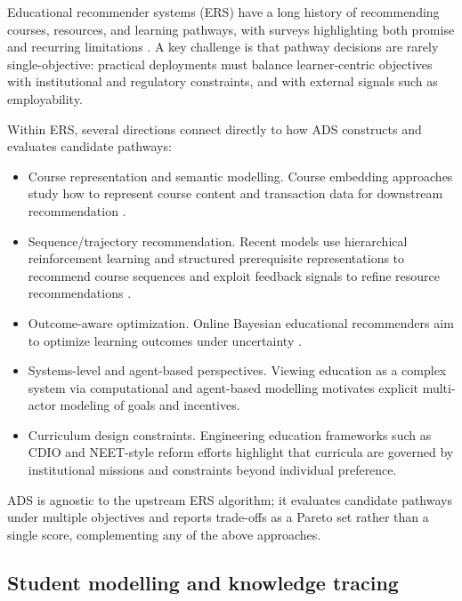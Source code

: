 \documentclass[sigconf,review]{acmart}
\begin{document}
Educational recommender systems (ERS) have a long history of recommending courses, resources, and learning pathways, with surveys highlighting both promise and recurring limitations \cite{shi2020,dasilva2022slrERS,aucancela2023ersslr}.
A key challenge is that pathway decisions are rarely single-objective: practical deployments must balance learner-centric objectives with institutional and regulatory constraints, and with external signals such as employability.

Within ERS, several directions connect directly to how ADS constructs and evaluates candidate pathways:
\begin{itemize}
    \item {Course representation and semantic modelling.} Course embedding approaches study how to represent course content and transaction data for downstream recommendation \cite{jiang2020multifactorCourse2vec,xu2023courseEmbeddings}.
    \item {Sequence/trajectory recommendation.} Recent models use hierarchical reinforcement learning and structured prerequisite representations to recommend course sequences \cite{hhcor2024} and exploit feedback signals to refine resource recommendations \cite{dfrp2024}.
    \item {Outcome-aware optimization.} Online Bayesian educational recommenders aim to optimize learning outcomes under uncertainty \cite{ober2025}.
    \item {Systems-level and agent-based perspectives.} Viewing education as a complex system via computational and agent-based modelling \cite{vulic2024complexEdu,reardon2016abm-education} motivates explicit multi-actor modeling of goals and incentives.
    \item {Curriculum design constraints.} Engineering education frameworks such as CDIO \cite{crawley2011cdio} and NEET-style reform efforts \cite{crawley2018neet} highlight that curricula are governed by institutional missions and constraints beyond individual preference.
\end{itemize}

\noindent
ADS is agnostic to the upstream ERS algorithm; it evaluates candidate pathways under multiple objectives and reports trade-offs as a Pareto set rather than a single score, complementing any of the above approaches.

\subsection{Student modelling and knowledge tracing}
\label{sec:rw-kt}
\end{document}
